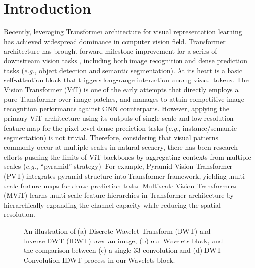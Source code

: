 \documentclass[runningheads]{llncs}
\begin{document}
\section{Introduction}

Recently, leveraging Transformer architecture \cite{vaswani2017attention} for visual representation learning has achieved widespread dominance in computer vision field. Transformer architecture has brought forward milestone improvement for a series of downstream vision tasks \cite{carion2020end,chu2021twins,dosovitskiy2020image,li2022comprehending,liu2021swin,long2022stand,long2022DTF,pan2020x,wang2021pvtv2,zhang2021token,zhang2022exploring}, including both image recognition and dense prediction tasks (\emph{e.g.}, object detection and semantic segmentation). At its heart is a basic self-attention block that triggers long-range interaction among visual tokens.
The Vision Transformer (ViT) \cite{dosovitskiy2020image} is one of the early attempts that directly employs a pure Transformer over image patches, and manages to attain competitive image recognition performance against CNN counterparts. However, applying the primary ViT architecture using its outputs of single-scale and low-resolution feature map for the pixel-level dense prediction tasks (\emph{e.g.}, instance/semantic segmentation) is not trivial. Therefore, considering that visual patterns commonly occur at multiple scales in natural scenery, there has been research efforts pushing the limits of ViT backbones by aggregating contexts from multiple scales (\emph{e.g.}, ``pyramid'' strategy). For example, Pyramid Vision Transformer (PVT) \cite{wang2021pyramid,wang2021pvtv2} integrates pyramid structure into Transformer framework, yielding multi-scale feature maps for dense prediction tasks. Multiscale Vision Transformers (MViT) \cite{fan2021multiscale} learns multi-scale feature hierarchies in Transformer architecture by hierarchically expanding the channel capacity while reducing the spatial resolution.

\begin{figure*}[!tb]
\vspace{-0.2in}
\vspace{-0.2in}
\caption{\small An illustration of (a) Discrete Wavelet Transform (DWT) and Inverse DWT (IDWT) over an image, (b) our Wavelets block, and the comparison between (c) a single 33 convolution and (d) DWT-Convolution-IDWT process in our Wavelets block.}
\label{fig:fig1}
\vspace{-0.22in}
\end{figure*}
\end{document}
